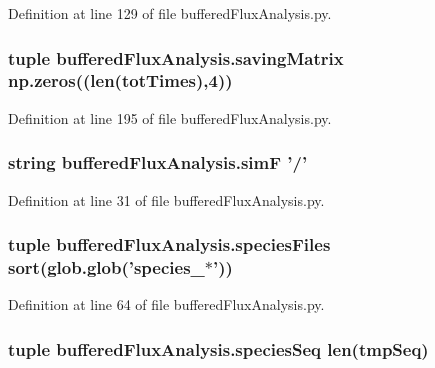 Definition at line 129 of file buffered\-Flux\-Analysis.\-py.

\hypertarget{namespacebuffered_flux_analysis_a20f8e8350b77ca9121474e7177166800}{
\subsubsection[{saving\-Matrix}]{\setlength{\rightskip}{0pt plus 5cm}tuple buffered\-Flux\-Analysis.\-saving\-Matrix np.\-zeros((len({\bf tot\-Times}),4))}}\label{namespacebuffered_flux_analysis_a20f8e8350b77ca9121474e7177166800}


Definition at line 195 of file buffered\-Flux\-Analysis.\-py.

\hypertarget{namespacebuffered_flux_analysis_a94f9529239340003572ace8de46bee35}{
\subsubsection[{sim\-F}]{\setlength{\rightskip}{0pt plus 5cm}string buffered\-Flux\-Analysis.\-sim\-F '/'}}\label{namespacebuffered_flux_analysis_a94f9529239340003572ace8de46bee35}


Definition at line 31 of file buffered\-Flux\-Analysis.\-py.

\hypertarget{namespacebuffered_flux_analysis_a898dbb3abbe3e409d2ee83d4a5362d6b}{
\subsubsection[{species\-Files}]{\setlength{\rightskip}{0pt plus 5cm}tuple buffered\-Flux\-Analysis.\-species\-Files sort(glob.\-glob('species\-\_\-$\ast$'))}}\label{namespacebuffered_flux_analysis_a898dbb3abbe3e409d2ee83d4a5362d6b}


Definition at line 64 of file buffered\-Flux\-Analysis.\-py.

\hypertarget{namespacebuffered_flux_analysis_a19a0d4fb7445508e6204894b5f4eca23}{
\subsubsection[{species\-Seq}]{\setlength{\rightskip}{0pt plus 5cm}tuple buffered\-Flux\-Analysis.\-species\-Seq len(tmp\-Seq)}}\label{namespacebuffered_flux_analysis_a19a0d4fb7445508e6204894b5f4eca23}


